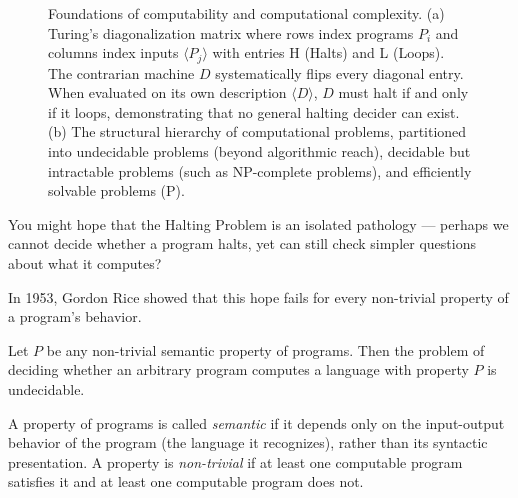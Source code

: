 \begin{figure}[htbp]
\caption{Foundations of computability and computational complexity. (a) Turing's diagonalization matrix where rows index programs $P_i$ and columns index inputs $\langle P_j \rangle$ with entries H (Halts) and L (Loops). The contrarian machine $D$ systematically flips every diagonal entry. When evaluated on its own description $\langle D \rangle$, $D$ must halt if and only if it loops, demonstrating that no general halting decider can exist. (b) The structural hierarchy of computational problems, partitioned into undecidable problems (beyond algorithmic reach), decidable but intractable problems (such as NP-complete problems), and efficiently solvable problems ($\mathrm{P}$).}
\label{ch33:fig-halting-diagonal}
\end{figure}

You might hope that the Halting Problem is an isolated pathology --- perhaps we cannot decide whether a program halts, yet can still check simpler questions about what it computes?

In 1953, Gordon Rice showed that this hope fails for every non-trivial property of a program's behavior.

\begin{theorem}
\label{ch33:thm-rice}
Let $P$ be any non-trivial semantic property of programs. Then the problem of deciding whether an arbitrary program computes a language with property $P$ is undecidable.
\end{theorem}

A property of programs is called \emph{semantic} if it depends only on the input-output behavior of the program (the language it recognizes), rather than its syntactic presentation. A property is \emph{non-trivial} if at least one computable program satisfies it and at least one computable program does not.

